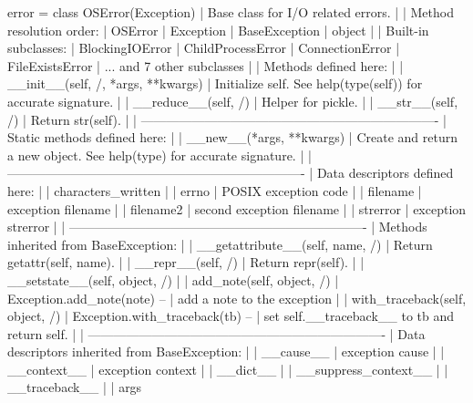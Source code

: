 \documentclass{article}
\begin{document}
    error = class OSError(Exception)
     |  Base class for I/O related errors.
     |
     |  Method resolution order:
     |      OSError
     |      Exception
     |      BaseException
     |      object
     |
     |  Built-in subclasses:
     |      BlockingIOError
     |      ChildProcessError
     |      ConnectionError
     |      FileExistsError
     |      ... and 7 other subclasses
     |
     |  Methods defined here:
     |
     |  __init__(self, /, *args, **kwargs)
     |      Initialize self.  See help(type(self)) for accurate signature.
     |
     |  __reduce__(self, /)
     |      Helper for pickle.
     |
     |  __str__(self, /)
     |      Return str(self).
     |
     |  ----------------------------------------------------------------------
     |  Static methods defined here:
     |
     |  __new__(*args, **kwargs)
     |      Create and return a new object.  See help(type) for accurate signature.
     |
     |  ----------------------------------------------------------------------
     |  Data descriptors defined here:
     |
     |  characters_written
     |
     |  errno
     |      POSIX exception code
     |
     |  filename
     |      exception filename
     |
     |  filename2
     |      second exception filename
     |
     |  strerror
     |      exception strerror
     |
     |  ----------------------------------------------------------------------
     |  Methods inherited from BaseException:
     |
     |  __getattribute__(self, name, /)
     |      Return getattr(self, name).
     |
     |  __repr__(self, /)
     |      Return repr(self).
     |
     |  __setstate__(self, object, /)
     |
     |  add_note(self, object, /)
     |      Exception.add_note(note) --
     |      add a note to the exception
     |
     |  with_traceback(self, object, /)
     |      Exception.with_traceback(tb) --
     |      set self.__traceback__ to tb and return self.
     |
     |  ----------------------------------------------------------------------
     |  Data descriptors inherited from BaseException:
     |
     |  __cause__
     |      exception cause
     |
     |  __context__
     |      exception context
     |
     |  __dict__
     |
     |  __suppress_context__
     |
     |  __traceback__
     |
     |  args
\end{document}
